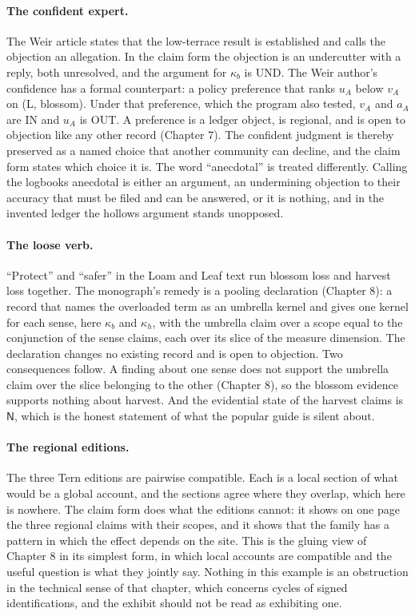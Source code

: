 \documentclass[11pt]{article}
\newcommand{\IN}{\textsf{IN}}
\newcommand{\UND}{\textsf{UND}}
\newcommand{\OUT}{\textsf{OUT}}
\begin{document}
\paragraph{The confident expert.} The Weir article states that the low-terrace result is established and calls the objection an allegation. In the claim form the objection is an undercutter with a reply, both unresolved, and the argument for $\kappa_b$ is \UND{}. The Weir author's confidence has a formal counterpart: a policy preference that ranks $u_A$ below $v_A$ on (L, blossom). Under that preference, which the program also tested, $v_A$ and $a_A$ are \IN{} and $u_A$ is \OUT{}. A preference is a ledger object, is regional, and is open to objection like any other record (Chapter 7). The confident judgment is thereby preserved as a named choice that another community can decline, and the claim form states which choice it is. The word ``anecdotal'' is treated differently. Calling the logbooks anecdotal is either an argument, an undermining objection to their accuracy that must be filed and can be answered, or it is nothing, and in the invented ledger the hollows argument stands unopposed.

\paragraph{The loose verb.} ``Protect'' and ``safer'' in the Loam and Leaf text run blossom loss and harvest loss together. The monograph's remedy is a pooling declaration (Chapter 8): a record that names the overloaded term as an umbrella kernel and gives one kernel for each sense, here $\kappa_b$ and $\kappa_h$, with the umbrella claim over a scope equal to the conjunction of the sense claims, each over its slice of the measure dimension. The declaration changes no existing record and is open to objection. Two consequences follow. A finding about one sense does not support the umbrella claim over the slice belonging to the other (Chapter 8), so the blossom evidence supports nothing about harvest. And the evidential state of the harvest claims is $\mathsf N$, which is the honest statement of what the popular guide is silent about.

\paragraph{The regional editions.} The three Tern editions are pairwise compatible. Each is a local section of what would be a global account, and the sections agree where they overlap, which here is nowhere. The claim form does what the editions cannot: it shows on one page the three regional claims with their scopes, and it shows that the family has a pattern in which the effect depends on the site. This is the gluing view of Chapter 8 in its simplest form, in which local accounts are compatible and the useful question is what they jointly say. Nothing in this example is an obstruction in the technical sense of that chapter, which concerns cycles of signed identifications, and the exhibit should not be read as exhibiting one.
\end{document}
